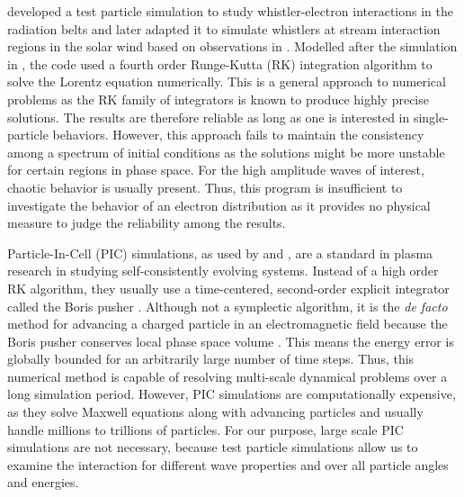 
\cite{Kersten2014} developed a test particle
simulation to study whistler-electron interactions in the radiation belts
and later adapted it to simulate whistlers at stream interaction regions in the
solar wind based on observations in \cite{Breneman2010}. Modelled after the
simulation in \cite{Roth1999}, the code used a fourth order Runge-Kutta (RK)
integration algorithm to solve the Lorentz equation numerically. This is a
general approach to numerical problems as the RK family of integrators is known
to produce highly precise solutions. The results are therefore reliable as long as one is interested in single-particle behaviors. However, this approach fails to maintain the consistency among a spectrum of initial conditions as the solutions might be more unstable for certain regions in phase space. For the high amplitude waves of interest, chaotic behavior is usually present. Thus, this program is insufficient to investigate the behavior of an electron distribution as it provides no physical measure to judge the reliability among the results.

Particle-In-Cell (PIC) simulations, as used by \cite{Micera2020} and
\cite{RobergClark2019}, are a standard in plasma research in studying
self-consistently evolving systems. Instead of a high order RK algorithm, they
usually use a time-centered, second-order explicit integrator called the Boris
pusher \citep{Birdsall&Langdon1985}. Although not a symplectic algorithm,
it is the \textit{de facto} method for advancing a charged particle in an
electromagnetic field because the Boris pusher conserves local phase space
volume \citep{Qin2013}. This means the energy error is globally bounded for an
arbitrarily large number of time steps. Thus, this numerical method is capable
of resolving multi-scale dynamical problems over a long simulation period.
However, PIC simulations are computationally expensive, as they solve Maxwell
equations along with advancing particles and usually handle millions to
trillions of particles. For our purpose, large scale PIC simulations are not
necessary, because test particle simulations allow us to examine the interaction
for different wave properties and over all particle angles and energies.


